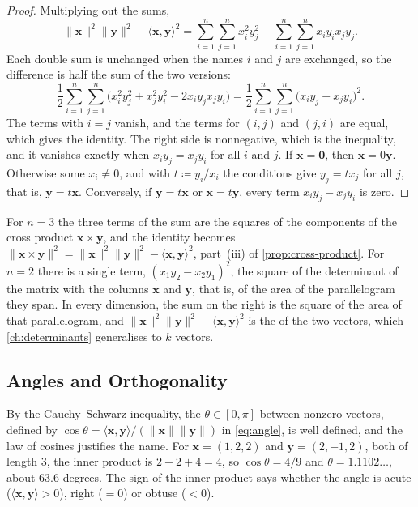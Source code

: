 \begin{proof}
Multiplying out the sums,
\[
\|\mathbf x\|^2\|\mathbf y\|^2-\langle\mathbf x,\mathbf y\rangle^2=\sum_{i=1}^n\sum_{j=1}^nx_i^2y_j^2-\sum_{i=1}^n\sum_{j=1}^nx_iy_ix_jy_j .
\]
Each double sum is unchanged when the names $i$ and $j$ are exchanged, so the difference is half the sum of the two versions:
\[
\frac12\sum_{i=1}^n\sum_{j=1}^n\bigl(x_i^2y_j^2+x_j^2y_i^2-2x_iy_jx_jy_i\bigr)=\frac12\sum_{i=1}^n\sum_{j=1}^n\bigl(x_iy_j-x_jy_i\bigr)^2 .
\]
The terms with $i=j$ vanish, and the terms for $(i,j)$ and $(j,i)$ are equal, which gives the identity. The right side is nonnegative, which is the inequality, and it vanishes exactly when $x_iy_j=x_jy_i$ for all $i$ and $j$. If $\mathbf x=\mathbf 0$, then $\mathbf x=0\mathbf y$. Otherwise some $x_i\ne0$, and with $t\coloneqq y_i/x_i$ the conditions give $y_j=tx_j$ for all $j$, that is, $\mathbf y=t\mathbf x$. Conversely, if $\mathbf y=t\mathbf x$ or $\mathbf x=t\mathbf y$, every term $x_iy_j-x_jy_i$ is zero.
\end{proof}

For $n=3$ the three terms of the sum are the squares of the components of the cross product $\mathbf x\times\mathbf y$, and the identity becomes $\|\mathbf x\times\mathbf y\|^2=\|\mathbf x\|^2\|\mathbf y\|^2-\langle\mathbf x,\mathbf y\rangle^2$, part~(iii) of \cref{prop:cross-product}. For $n=2$ there is a single term, $(x_1y_2-x_2y_1)^2$, the square of the determinant of the matrix with the columns $\mathbf x$ and $\mathbf y$, that is, of the area of the parallelogram they span. In every dimension, the sum on the right is the square of the area of that parallelogram, and $\|\mathbf x\|^2\|\mathbf y\|^2-\langle\mathbf x,\mathbf y\rangle^2$ is the  of the two vectors, which \cref{ch:determinants} generalises to $k$ vectors.

\subsection{Angles and Orthogonality}

By the Cauchy--Schwarz inequality, the  $\theta\in[0,\pi]$ between nonzero vectors, defined by $\cos\theta=\langle\mathbf x,\mathbf y\rangle/(\|\mathbf x\|\|\mathbf y\|)$ in \eqref{eq:angle}, is well defined, and the law of cosines justifies the name. For $\mathbf x=(1,2,2)$ and $\mathbf y=(2,-1,2)$, both of length $3$, the inner product is $2-2+4=4$, so $\cos\theta=4/9$ and $\theta=1.1102\ldots$, about $63.6$ degrees. The sign of the inner product says whether the angle is acute ($\langle\mathbf x,\mathbf y\rangle>0$), right ($=0$) or obtuse ($<0$).

